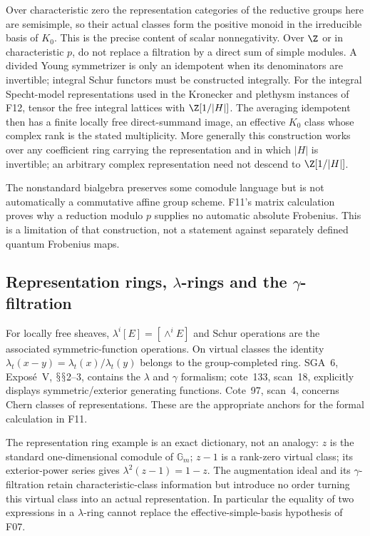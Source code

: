 \documentclass[11pt,a4paper]{article}
\renewcommand{\S}{\ensuremath{\mathsection}}
\newcommand{\fid}[1]{\textsf{#1}}\newcommand{\gate}[1]{\textsf{#1}}
\theoremstyle{named}\newtheorem{finding}{Finding}[section]
\theoremstyle{definition}\newtheorem{definition}[finding]{Definition}
\theoremstyle{remark}\newtheorem{remark}[finding]{Remark}
\begin{document}
Over characteristic zero the representation categories of the reductive groups here are semisimple, so their actual classes form the positive monoid in the irreducible basis of $K_0$. This is the precise content of scalar nonnegativity. Over $\Z$ or in characteristic $p$, do not replace a filtration by a direct sum of simple modules. A divided Young symmetrizer is only an idempotent when its denominators are invertible; integral Schur functors must be constructed integrally. For the integral Specht-model representations used in the Kronecker and plethysm instances of \fid{F12}, tensor the free integral lattices with $\Z[1/|H|]$. The averaging idempotent then has a finite locally free direct-summand image, an effective $K_0$ class whose complex rank is the stated multiplicity. More generally this construction works over any coefficient ring carrying the representation and in which $|H|$ is invertible; an arbitrary complex representation need not descend to $\Z[1/|H|]$.

The nonstandard bialgebra preserves some comodule language but is not automatically a commutative affine group scheme. \fid{F11}'s matrix calculation proves why a reduction modulo $p$ supplies no automatic absolute Frobenius. This is a limitation of that construction, not a statement against separately defined quantum Frobenius maps.

\subsection{Representation rings, $\lambda$-rings and the $\gamma$-filtration}
For locally free sheaves, $\lambda^i[E]=[\wedge^iE]$ and Schur operations are the associated symmetric-function operations. On virtual classes the identity $\lambda_t(x-y)=\lambda_t(x)/\lambda_t(y)$ belongs to the group-completed ring. SGA~6, Expos\'e~V, \S\S2--3, contains the $\lambda$ and $\gamma$ formalism; cote~133, scan~18, explicitly displays symmetric/exterior generating functions. Cote~97, scan~4, concerns Chern classes of representations. These are the appropriate anchors for the formal calculation in \fid{F11}.

The representation ring example is an exact dictionary, not an analogy: $z$ is the standard one-dimensional comodule of $\mathbb G_m$; $z-1$ is a rank-zero virtual class; its exterior-power series gives $\lambda^2(z-1)=1-z$. The augmentation ideal and its $\gamma$-filtration retain characteristic-class information but introduce no order turning this virtual class into an actual representation. In particular the equality of two expressions in a $\lambda$-ring cannot replace the effective-simple-basis hypothesis of \fid{F07}.
\end{document}
